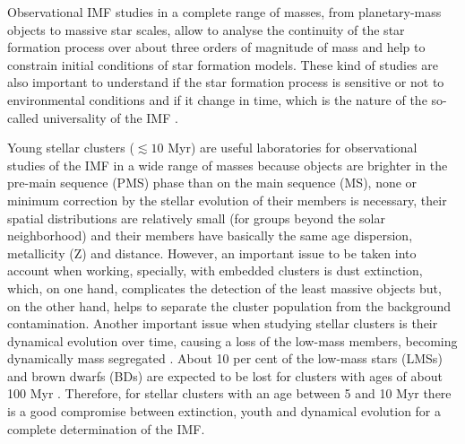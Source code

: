 \documentclass[12pt]{article}
\begin{document}
Observational IMF studies in a complete range of masses, from planetary-mass objects to massive star scales, allow to analyse the continuity of the star formation process over about three orders of magnitude of mass and help to constrain initial conditions of star formation models. These kind of studies are also important to understand if the star formation process is sensitive or not to environmental conditions and if it change in time, which is the nature of the so-called universality of the IMF \cite[e.g.][]{Kroupa2013,Offner2014}.

 Young stellar clusters ($\lesssim 10$ Myr) are useful laboratories for observational studies of the IMF in a wide range of masses because objects are brighter in the pre-main sequence (\ac{PMS}) phase than on the main sequence (\ac{MS}), none or minimum correction by the stellar evolution of their members is necessary, their spatial distributions are relatively small (for groups beyond the solar neighborhood) and their members have basically the same age dispersion, metallicity (\ac{Z}) and distance. However, an important issue to be taken into account when working, specially, with embedded clusters \citep[$\lesssim3$ Myr; ][]{Lada-Lada2003} is dust extinction, which, on one hand, complicates the detection of the least massive objects but, on the other hand, helps to separate the cluster population from the background contamination. Another important issue when studying stellar clusters is their dynamical evolution over time, causing a loss of the low-mass members, becoming dynamically mass segregated \citep[e.g., ][]{Elmegreen2000}. About 10 per cent of the low-mass stars (\ac{LMS}s) and brown dwarfs (\ac{BD}s) are expected to be lost for clusters with ages of about 100 Myr \citep{deLaFuenteMarcos-deLaFuenteMarcos2000}. Therefore, for stellar clusters with an age between 5 and 10 Myr there is a good compromise between extinction, youth and dynamical evolution for a complete determination of the IMF.
\end{document}
